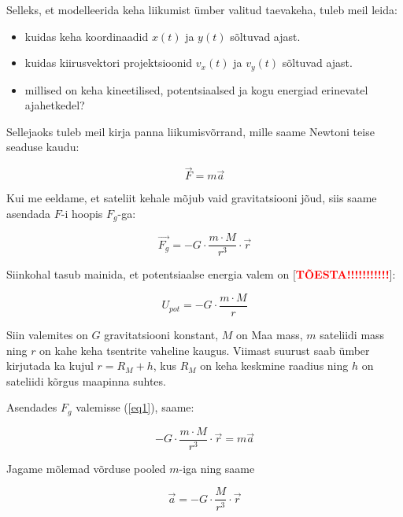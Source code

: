 \begin{flushleft}


Selleks, et modelleerida keha liikumist ümber valitud taevakeha, tuleb meil leida:

\begin{itemize}
\item kuidas keha koordinaadid $x(t)$ ja $y(t)$ sõltuvad ajast. 


\item kuidas kiirusvektori projektsioonid $v_{x}(t)$ ja $v_{y}(t)$ sõltuvad ajast.

\item millised on keha kineetilised, potentsiaalsed ja kogu energiad erinevatel ajahetkedel?
\end{itemize}

Sellejaoks tuleb meil kirja panna liikumisvõrrand, mille saame Newtoni teise seaduse kaudu:

\begin{equation}
\label{eq1}
\vec{F}=m\vec{a}
\end{equation}

Kui me eeldame, et sateliit kehale mõjub vaid gravitatsiooni jõud, siis saame asendada $F$-i hoopis $F_{g}$-ga:

\begin{equation}
\label{eq2}
\vec{F_{g}}= -G \cdot \dfrac{m \cdot M}{r^{3}}\cdot \vec{r}
\end{equation}

Siinkohal tasub mainida, et potentsiaalse energia valem on [\textbf{\textcolor{red}{TÕESTA!!!!!!!!!!!}}]:

\begin{equation}
\label{eq3}
U_{pot}=-G\cdot \dfrac{m \cdot M}{r}
\end{equation}

Siin valemites on $G$ gravitatsiooni konstant, $M$ on Maa mass, $m$ sateliidi mass ning $r$ on kahe keha tsentrite vaheline kaugus. Viimast suurust saab ümber kirjutada ka kujul $r=R_{M}+h$, kus $R_{M}$ on keha keskmine raadius ning $h$ on sateliidi kõrgus maapinna suhtes.

Asendades $F_{g}$ valemisse (\ref{eq1}), saame:

\begin{equation}
\label{eq4}
-G \cdot \dfrac{m \cdot M}{r^{3}}\cdot \vec{r} = m \vec{a}
\end{equation}

Jagame mõlemad võrduse pooled $m$-iga ning saame

\begin{equation}
\label{eq5}
\vec{a}=-G \cdot \dfrac{M}{r^{3}}\cdot \vec{r} 
\end{equation}


\end{flushleft}

